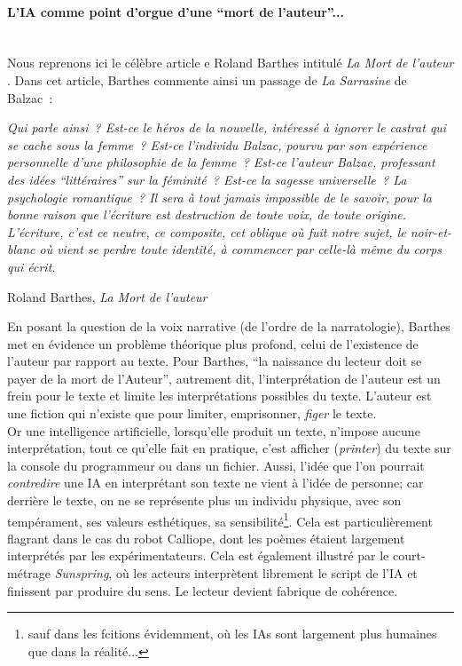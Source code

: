 \documentclass{article}
\newcommand{\subsubsubsection}[1]{\paragraph{#1}\mbox{}\\}
\newenvironment{citationbox}
{\begin{center}
		\begin{minipage}{.8\textwidth}
		}
		{
		\end{minipage}	
\end{center}
}
\begin{document}
				\subsubsubsection{L'IA comme point d'orgue d'une ``mort de l'auteur''...}
					Nous reprenons ici le célèbre article e Roland Barthes intitulé \textit{La Mort de l'auteur} \cite{barthes1968}. Dans cet article, Barthes commente ainsi un passage de \textit{La Sarrasine} de Balzac~:
					\begin{citationbox}
						\textit{Qui parle ainsi~? Est-ce
						le héros de la nouvelle, intéressé à ignorer le castrat qui se cache sous la femme~? Est-ce l'individu
						Balzac, pourvu par son expérience personnelle d'une philosophie de la femme~? Est-ce l'auteur
						Balzac, professant des idées ``littéraires'' sur la féminité~? Est-ce la sagesse universelle~? La psychologie romantique~? Il sera à tout jamais impossible de le savoir, pour la bonne raison que l'écriture est destruction de toute voix, de toute origine. L'écriture, c'est ce neutre, ce composite, cet
						oblique où fuit notre sujet, le noir-et-blanc où vient se perdre toute identité, à commencer par
						celle-là même du corps qui écrit.}
						\begin{flushright}
							Roland Barthes, \textit{La Mort de l'auteur} \cite{barthes1968}
						\end{flushright}
					\end{citationbox}
					En posant la question de la voix narrative (de l'ordre de la narratologie), Barthes met en évidence un problème théorique plus profond, celui de l'existence de l'auteur par rapport au texte. Pour Barthes, ``la naissance du lecteur doit se payer de la mort de l'Auteur'', autrement dit, l'interprétation de l'auteur est un frein pour le texte et limite les interprétations possibles du texte. L'auteur est une fiction qui n'existe que pour limiter, emprisonner, \textit{figer} le texte.\\
					Or une intelligence artificielle, lorsqu'elle produit un texte, n'impose aucune interprétation, tout ce qu'elle fait en pratique, c'est afficher (\textit{printer}) du texte sur la console du programmeur ou dans un fichier. Aussi, l'idée que l'on pourrait \textit{contredire} une IA en interprétant son texte ne vient à l'idée de personne; car derrière le texte, on ne se représente plus un individu physique, avec son tempérament, ses valeurs esthétiques, sa sensibilité\footnote{sauf dans les fcitions évidemment, où les IAs sont largement plus humaines que dans la réalité...}. Cela est particulièrement flagrant dans le cas du robot Calliope, dont les poèmes étaient largement interprétés par les expérimentateurs. Cela est également illustré par le court-métrage \textit{Sunspring}, où les acteurs interprètent librement le script de l'IA et finissent par produire du sens. Le lecteur devient fabrique de cohérence.\\
\end{document}
